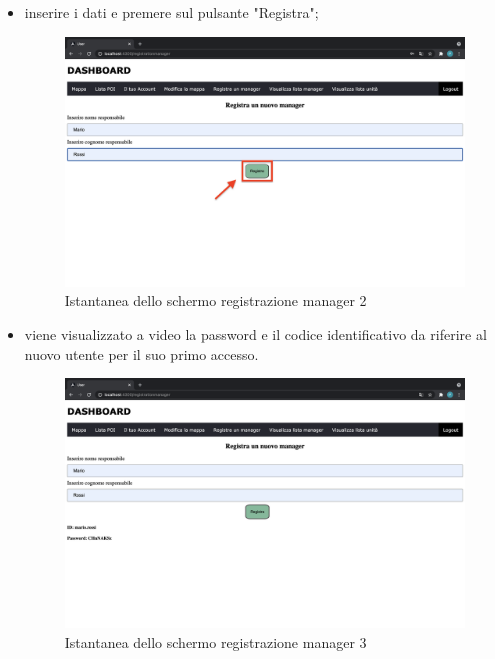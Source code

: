 \begin{itemize}
    \item inserire i dati e premere sul pulsante "Registra";
    \begin{figure}[H]
        \centering
        \includegraphics[scale=0.12]{res/images/newmanager_2.png}
        \caption{Istantanea dello schermo registrazione manager 2}
    \end{figure}
    \item viene visualizzato a video la password e il codice identificativo da riferire al nuovo utente per il suo primo accesso.
    \begin{figure}[H]
        \centering
        \includegraphics[scale=0.12]{res/images/newmanager3.png}
        \caption{Istantanea dello schermo registrazione manager 3}
    \end{figure}
\end{itemize}




